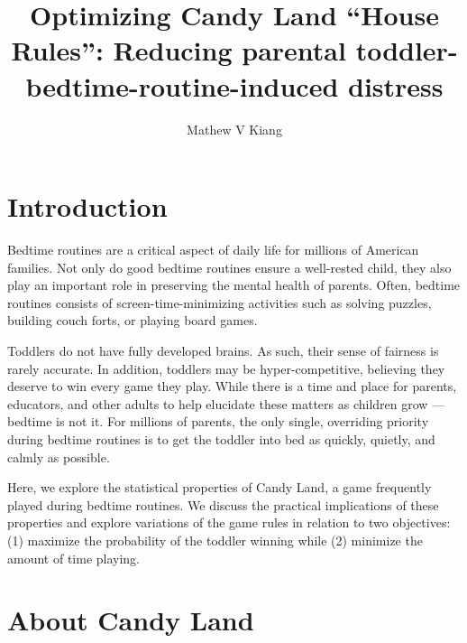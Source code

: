 \documentclass[letterpaper,9pt,twocolumn,twoside,]{pinp}
\title{Optimizing Candy Land ``House Rules'': Reducing parental
toddler-bedtime-routine-induced distress}
\author[a,b]{Mathew V Kiang}
\affil[a]{Instructor, Department of Epidemiology and Population Health, Stanford
University}
\affil[b]{Fellow, Harvard FXB Center for Health and Human Rights, Harvard
University}
\begin{document}
\verticaladjustment{-2pt}

\maketitle
\thispagestyle{firststyle}



\hypertarget{introduction}{%
\section{Introduction}\label{introduction}}

Bedtime routines are a critical aspect of daily life for millions of
American families. Not only do good bedtime routines ensure a
well-rested child, they also play an important role in preserving the
mental health of parents. Often, bedtime routines consists of
screen-time-minimizing activities such as solving puzzles, building
couch forts, or playing board games.

Toddlers do not have fully developed brains. As such, their sense of
fairness is rarely accurate. In addition, toddlers may be
hyper-competitive, believing they deserve to win every game they play.
While there is a time and place for parents, educators, and other adults
to help elucidate these matters as children grow --- bedtime is not it.
For millions of parents, the only single, overriding priority during
bedtime routines is to get the toddler into bed as quickly, quietly, and
calmly as possible.

Here, we explore the statistical properties of Candy Land, a game
frequently played during bedtime routines. We discuss the practical
implications of these properties and explore variations of the game
rules in relation to two objectives: (1) maximize the probability of the
toddler winning while (2) minimize the amount of time playing.

\hypertarget{about-candy-land}{%
\section{About Candy Land}\label{about-candy-land}}
\end{document}
